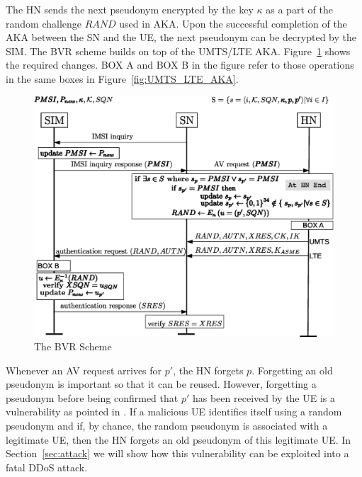 \documentclass{llncs} %
\begin{document}
The HN sends the next pseudonym encrypted by the key $\kappa$ as a part of the random challenge $RAND$ used in AKA. Upon the successful completion of the AKA between the SN and the UE, the next pseudonym can be decrypted by the SIM. The BVR scheme builds on top of the UMTS/LTE AKA. Figure~\ref{fig:bvr_solution} shows the required changes. BOX A and BOX B in the figure refer to those operations in the same boxes in Figure~\ref{fig:UMTS_LTE_AKA}.


\begin{figure}[]
  \centering
    \includegraphics[scale = .4,clip = true,trim = .1cm 0cm 0cm 0cm]{BVR.eps}
  \caption{The BVR Scheme}
  \label{fig:bvr_solution}	
\end{figure}

Whenever an AV request arrives for $p'$, the HN forgets $p$. Forgetting an old pseudonym is important so that it can be reused. However, forgetting a pseudonym before being confirmed that $p'$ has been received by the UE is a vulnerability as pointed in \cite{wisec17}. If a malicious UE identifies itself using a random pseudonym and if, by chance, the random pseudonym is associated with a legitimate UE, then the HN forgets an old pseudonym of this legitimate UE. In Section~\ref{sec:attack} we will show how this vulnerability can be exploited into a fatal DDoS attack.
\end{document}
